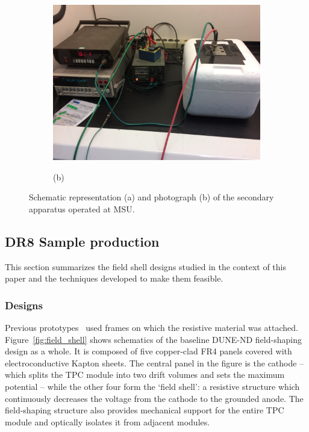 \documentclass[a4paper,12pt]{article}
\begin{document}
\begin{figure}[htb]
\begin{subfigure}[c]{0.39\linewidth}
\begin{center}
		\includegraphics[width=\linewidth]{MSU_styro_setup_picture.jpg}
		\vspace*{3em} 
		
		(b)
	\end{center}
\end{subfigure}
\caption{Schematic representation (a) and photograph (b) of the secondary apparatus operated at MSU.}
\label{fig:msu_styro_setup}
\end{figure}


\subsection{DR8 Sample production}
\label{sec:field_shell}
This section summarizes the field shell designs studied in the context of this paper and the techniques developed to make them feasible.

\subsubsection{Designs} 
Previous prototypes~\cite{bern_lartpc,srmu_tpc} used frames on which the resistive material was attached. Figure~\ref{fig:field_shell} shows schematics of the baseline DUNE-ND field-shaping design as a whole. It is composed of five copper-clad FR4 panels covered with electroconductive Kapton sheets. The central panel in the figure is the cathode -- which splits the TPC module into two drift volumes and sets the maximum potential -- while the other four form the `field shell': a resistive structure which continuously decreases the voltage from the cathode to the grounded anode. The field-shaping structure also provides mechanical support for the entire TPC module and optically isolates it from adjacent modules.
\end{document}
